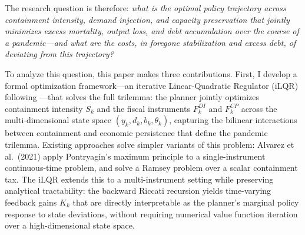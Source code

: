 \documentclass[12pt, a4paper]{article}
\begin{document}
The research question is therefore: \textit{what is the optimal policy trajectory
across containment intensity, demand injection, and capacity preservation that jointly
minimizes excess mortality, output loss, and debt accumulation over the course of a
pandemic---and what are the costs, in foregone stabilization and excess debt, of
deviating from this trajectory?}


To analyze this question, this paper makes three contributions. First, I develop a formal optimization framework---an iterative Linear-Quadratic Regulator (iLQR) following \citet{bertsekas2017dynamic}---that solves the full trilemma: the planner jointly optimizes containment intensity $S_k$ and the fiscal instruments $F_k^{DI}$ and $F_k^{CP}$ across the multi-dimensional state space $(y_k, d_k, b_k, \theta_k)$, capturing the bilinear interactions between containment and economic persistence that define the pandemic trilemma. Existing approaches solve simpler variants of this problem: Alvarez et al.\ (2021) apply Pontryagin's maximum principle to a single-instrument continuous-time problem, and \citet{eichenbaum2021macro} solve a Ramsey problem over a scalar containment tax. The iLQR extends this to a multi-instrument setting while preserving analytical tractability: the backward Riccati recursion yields time-varying feedback gains $K_k$ that are directly interpretable as the planner's marginal policy response to state deviations, without requiring numerical value function iteration over a high-dimensional state space.%
\end{document}
